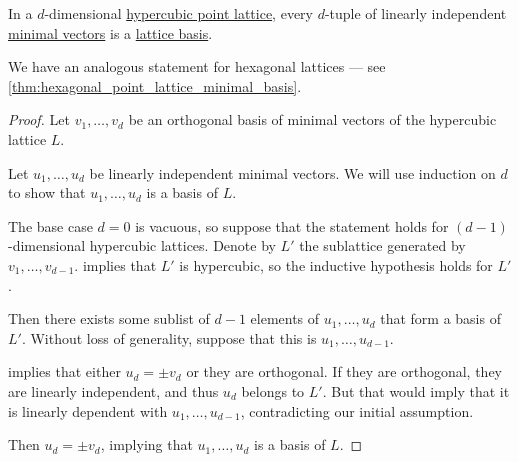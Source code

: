 \begin{corollary}\label{thm:hypercubic_point_lattice_minimal_basis}
  In a \( d \)-dimensional \hyperref[def:hypercubic_point_lattice]{hypercubic point lattice}, every \( d \)-tuple of linearly independent \hyperref[def:minimal_lattice_vector]{minimal vectors} is a \hyperref[def:point_lattice_basis]{lattice basis}.
\end{corollary}
\begin{comments}
  \item We have an analogous statement for hexagonal lattices --- see \cref{thm:hexagonal_point_lattice_minimal_basis}.
\end{comments}
\begin{proof}
  Let \( v_1, \ldots, v_d \) be an orthogonal basis of minimal vectors of the hypercubic lattice \( L \).

  Let \( u_1, \ldots, u_d \) be linearly independent minimal vectors. We will use induction on \( d \) to show that \( u_1, \ldots, u_d \) is a basis of \( L \).

  The base case \( d = 0 \) is vacuous, so suppose that the statement holds for \( (d - 1) \)-dimensional hypercubic lattices. Denote by \( L' \) the sublattice generated by \( v_1, \ldots, v_{d-1} \).  implies that \( L' \) is hypercubic, so the inductive hypothesis holds for \( L' \).

  Then there exists some sublist of \( d - 1 \) elements of \( u_1, \ldots, u_d \) that form a basis of \( L' \). Without loss of generality, suppose that this is \( u_1, \ldots, u_{d-1} \).

   implies that either \( u_d = \pm v_d \) or they are orthogonal. If they are orthogonal, they are linearly independent, and thus \( u_d \) belongs to \( L' \). But that would imply that it is linearly dependent with \( u_1, \ldots, u_{d-1} \), contradicting our initial assumption.

  Then \( u_d = \pm v_d \), implying that \( u_1, \ldots, u_d \) is a basis of \( L \).
\end{proof}

